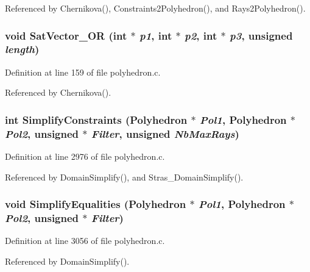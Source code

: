 Referenced by Chernikova(), Constraints2Polyhedron(), and Rays2Polyhedron().

\subsubsection{\setlength{\rightskip}{0pt plus 5cm}void Sat\-Vector\_\-OR (int $\ast$ {\em p1}, int $\ast$ {\em p2}, int $\ast$ {\em p3}, unsigned {\em length})\hspace{0.3cm}{\tt  [static]}}\label{polyhedron_8c_a10}




Definition at line 159 of file polyhedron.c.

Referenced by Chernikova().

\subsubsection{\setlength{\rightskip}{0pt plus 5cm}int Simplify\-Constraints (Polyhedron $\ast$ {\em Pol1}, Polyhedron $\ast$ {\em Pol2}, unsigned $\ast$ {\em Filter}, unsigned {\em Nb\-Max\-Rays})\hspace{0.3cm}{\tt  [static]}}\label{polyhedron_8c_a40}




Definition at line 2976 of file polyhedron.c.

Referenced by Domain\-Simplify(), and Stras\_\-Domain\-Simplify().

\subsubsection{\setlength{\rightskip}{0pt plus 5cm}void Simplify\-Equalities (Polyhedron $\ast$ {\em Pol1}, Polyhedron $\ast$ {\em Pol2}, unsigned $\ast$ {\em Filter})\hspace{0.3cm}{\tt  [static]}}\label{polyhedron_8c_a41}




Definition at line 3056 of file polyhedron.c.

Referenced by Domain\-Simplify().

